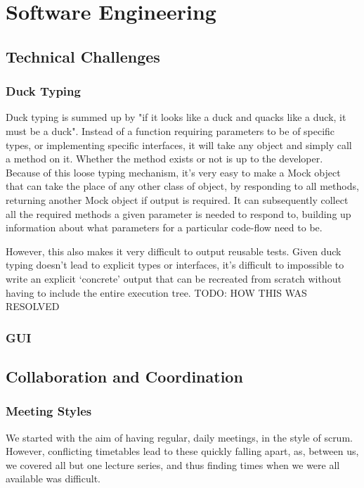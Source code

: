 \chapter{Software Engineering}
\section{Technical Challenges}
  \subsection{Duck Typing}
    Duck typing is summed up by "if it looks like a duck and quacks like a duck, it must be a duck".
    Instead of a function requiring parameters to be of specific types, or implementing specific interfaces, it will take any object and simply call a method on it.
    Whether the method exists or not is up to the developer.
    Because of this loose typing mechanism, it's very easy to make a Mock object that can take the place of any other class of object, by responding to all methods, returning another Mock object if output is required.
    It can subsequently collect all the required methods a given parameter is needed to respond to, building up information about what parameters for a particular code-flow need to be.

    However, this also makes it very difficult to output reusable tests.
    Given duck typing doesn't lead to explicit types or interfaces, it's difficult to impossible to write an explicit `concrete' output that can be recreated from scratch without having to include the entire execution tree.
    TODO: HOW THIS WAS RESOLVED

  \subsection{GUI}

\section{Collaboration and Coordination}

  \subsection{Meeting Styles}
    We started with the aim of having regular, daily meetings, in the style of scrum.
    However, conflicting timetables lead to these quickly falling apart, as, between us, we covered all but one lecture series, and thus finding times when we were all available was difficult.

